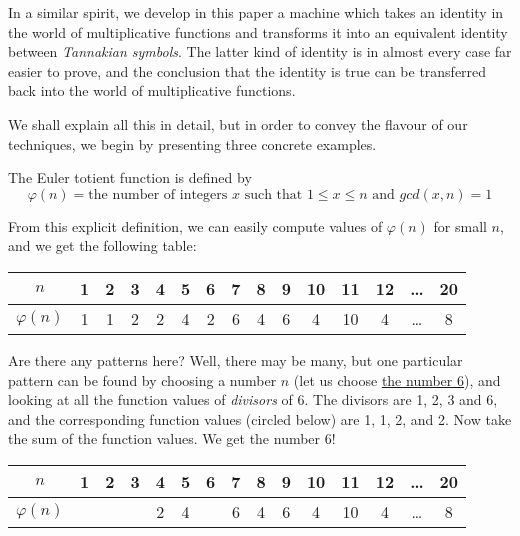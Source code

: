 \documentclass[a4paper]{article}
\begin{document}
In a similar spirit, we develop in this paper a machine which takes an identity in the world of multiplicative functions and transforms it into an equivalent identity between \emph{Tannakian symbols}. The latter kind of identity is in almost every case far easier to prove, and the conclusion that the identity is true can be transferred back into the world of multiplicative functions.

We shall explain all this in detail, but in order to convey the flavour of our techniques, we begin by presenting three concrete examples. 

\begin{example}
The Euler totient function is defined by
$$  \varphi(n) = \textrm{the number of integers $x$ such that $1 \leq x \leq n$ and $gcd(x, n) = 1$}  $$

From this explicit definition, we can easily compute values of $\varphi(n)$ for small $n$, and we get the following table:

\vspace{6pt}
\begin{tabular}{  | c || c | c | c | c | c | c | c | c | c | c | c | c | c | c |  }
  \hline			
  $n$ & 1 & 2 & 3 & 4 & 5 & 6 & 7 & 8 & 9 & 10 & 11 & 12 & \ldots & 20  \\
  \hline
  $\varphi(n) $ & 1 & 1 & 2 & 2 & 4 & 2 & 6 & 4 & 6 & 4 & 10 & 4 & \ldots & 8  \\
  \hline  
\end{tabular}
\vspace{6pt}

Are there any patterns here? Well, there may be many, but one particular pattern can be found by choosing a number $n$ (let us choose \underline{the number 6}), and looking at all the function values of \emph{divisors} of 6. The divisors are 1, 2, 3 and 6, and the corresponding function values (circled below) are 1, 1, 2, and 2. Now take the sum of the function values. We get the number 6!

\vspace{6pt}
\begin{tabular}{  | c || c | c | c | c | c | c | c | c | c | c | c | c | c | c |  }
  \hline			
  $n$ & \bf{1} & \bf{2} & \bf{3} & 4 & 5 & \bf{6} & 7 & 8 & 9 & 10 & 11 & 12 & \ldots & 20  \\
  \hline
  $\varphi(n) $ & \raisebox{.5pt}{\textcircled{\raisebox{-.9pt} {1}}} & \raisebox{.5pt}{\textcircled{\raisebox{-.9pt} {1}}} & \raisebox{.5pt}{\textcircled{\raisebox{-.9pt} {2}}} & 2 & 4 & \raisebox{.5pt}{\textcircled{\raisebox{-.9pt} {2}}} & 6 & 4 & 6 & 4 & 10 & 4 & \ldots & 8  \\
  \hline  
\end{tabular}
\vspace{6pt}


\end{example}
\end{document}
